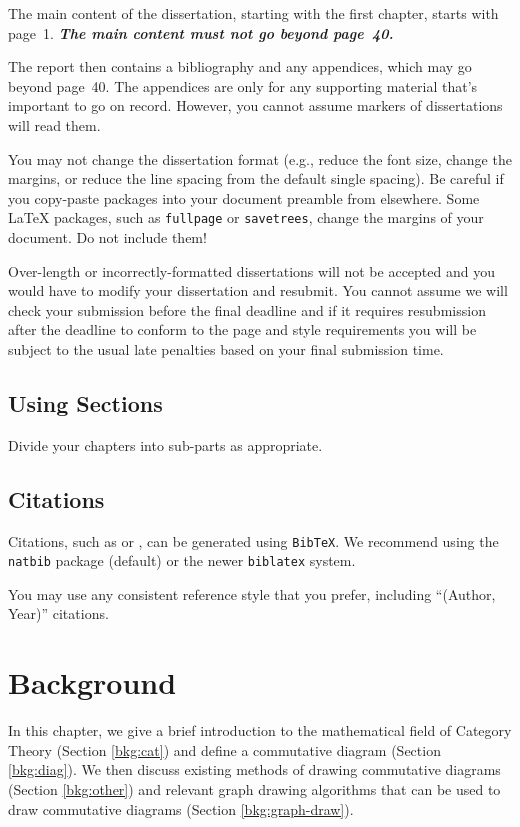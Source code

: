 \documentclass[logo,bsc,singlespacing,parskip]{infthesis}
\theoremstyle{definition}
\begin{document}
The main content of the dissertation, starting with the first chapter,
starts with page~1. \emph{\textbf{The main content must not go beyond page~40.}}

The report then contains a bibliography and any appendices, which may go beyond
page~40. The appendices are only for any supporting material that's important to
go on record. However, you cannot assume markers of dissertations will read them.

You may not change the dissertation format (e.g., reduce the font size, change
the margins, or reduce the line spacing from the default single spacing). Be
careful if you copy-paste packages into your document preamble from elsewhere.
Some \LaTeX{} packages, such as \texttt{fullpage} or \texttt{savetrees}, change
the margins of your document. Do not include them!

Over-length or incorrectly-formatted dissertations will not be accepted and you
would have to modify your dissertation and resubmit. You cannot assume we will
check your submission before the final deadline and if it requires resubmission
after the deadline to conform to the page and style requirements you will be
subject to the usual late penalties based on your final submission time.

\section{Using Sections}

Divide your chapters into sub-parts as appropriate.

\section{Citations}

Citations, such as \autocite{P1} or \autocite{P2}, can be generated using
\texttt{BibTeX}. We recommend using the \texttt{natbib} package (default) or the newer \texttt{biblatex} system. 

You may use any consistent reference style that you prefer, including ``(Author, Year)'' citations. 

\chapter{Background}
In this chapter, we give a brief introduction to the mathematical field of Category Theory (Section \ref{bkg:cat}) and define a commutative diagram (Section \ref{bkg:diag}). We then discuss existing methods of drawing commutative diagrams (Section \ref{bkg:other}) and relevant graph drawing algorithms that can be used to draw commutative diagrams (Section \ref{bkg:graph-draw}).
\end{document}
